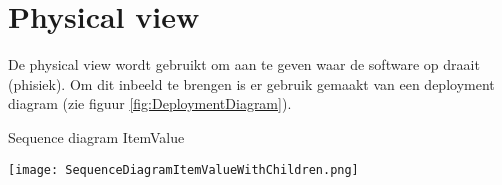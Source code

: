 \section{Physical view}
De physical view wordt gebruikt om aan te geven waar de software op draait (phisiek).
Om dit inbeeld te brengen is er gebruik gemaakt van een deployment diagram (zie figuur \ref{fig:DeploymentDiagram}).

\whitespace
\begin{graphic}
    \captionsetup{type=figure}
    \caption{Sequence diagram ItemValue}
    \texttt{[image: SequenceDiagramItemValueWithChildren.png]}
    \label{fig:DeploymentDiagram}
\end{graphic}
